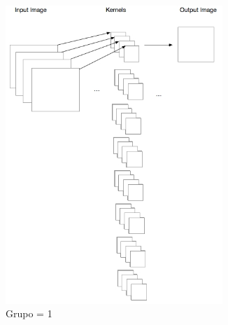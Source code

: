 \begin{itemize}
 \begin{figure}[H]
\begin{subfigure}{.33\textwidth}
  \centering
    \includegraphics[width =0.9\textwidth]{images/group/g1.jpg}
  \caption{Grupo = 1}
  \label{fig:sfig1}
\end{subfigure}%
\begin{subfigure}{.33\textwidth}
  \centering

\end{subfigure}
\end{figure}
\end{itemize}
